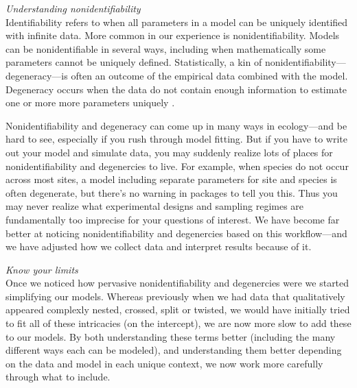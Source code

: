 \documentclass[11pt]{article}
\begin{document}
 \emph{Understanding nonidentifiability} \\
Identifiability refers to when all parameters in a model can be uniquely identified with infinite data. More common in our experience is nonidentifiability. Models can be nonidentifiable in several ways, including when mathematically some parameters cannot be uniquely defined. Statistically, a kin of nonidentifiability---degeneracy---is often an outcome of the empirical data combined with the model. Degeneracy occurs when the data do not contain enough information to estimate one or more more parameters uniquely \citep{gelmanhill}. 

Nonidentifiability and degeneracy can come up in many ways in ecology---and be hard to see, especially if you rush through model fitting. But if you have to write out your model and simulate data, you may suddenly realize lots of places for nonidentifiability and degenercies to live. For example, when species do not occur across most sites, a model including separate parameters for site and species is often degenerate, but there's no warning in packages to tell you this. Thus you may never realize what experimental designs and sampling regimes are fundamentally too imprecise for your questions of interest. We have become far better at noticing nonidentifiability and degenercies based on this workflow---and we have adjusted how we collect data and interpret results because of it. %

 \emph{Know your limits} \\ %
Once we noticed how pervasive nonidentifiability and degenercies were we started simplifying our models. Whereas previously when we had data that qualitatively appeared complexly nested, crossed, split or twisted, we would have initially tried to fit all of these intricacies (on the intercept), we are now more slow to add these to our models. By both understanding these terms better (including the many different ways each can be modeled), and understanding them better depending on the data and model in each unique context, we now work more carefully through what to include. %
\end{document}
